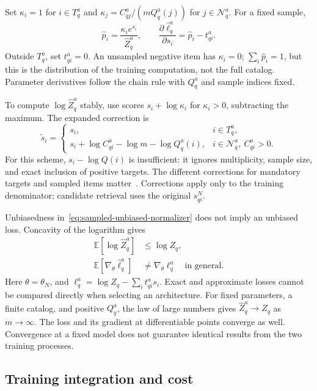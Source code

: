\documentclass[12pt,a4paper]{article}
\newcommand{\E}{\mathbb E}
\theoremstyle{plainru}
\begin{document}
Set $\kappa_i=1$ for $i\in T_q^a$ and
$\kappa_j=C_{qj}^a/(mQ_q^a(j))$ for $j\in\mathcal N_q^a$.
For a fixed sample,
\begin{equation}\label{eq:sampled-gradient}
\widehat p_i=\frac{\kappa_i e^{s_i}}{\widehat Z_q^a},
\qquad
\frac{\partial\widehat\ell_q^a}{\partial s_i}
=\widehat p_i-t_{qi}^a.
\end{equation}
Outside $T_q^a$, set $t_{qi}^a=0$. An unsampled negative item has $\kappa_i=0$;
$\sum_i\widehat p_i=1$, but this is the distribution of the training computation,
not the full catalog. Parameter derivatives follow the chain rule
with $Q_q^a$ and sample indices fixed.

To compute $\log\widehat Z_q^a$ stably, use scores
$s_i+\log\kappa_i$ for $\kappa_i>0$, subtracting the maximum.
The expanded correction is
\begin{equation}\label{eq:sampled-adjusted-score}
\widetilde s_i=
\begin{cases}
s_i, & i\in T_q^a,\\
s_i+\log C_{qi}^a-\log m-\log Q_q^a(i),
& i\in\mathcal N_q^a,\ C_{qi}^a>0.
\end{cases}
\end{equation}
For this scheme, $s_i-\log Q(i)$ is insufficient: it ignores multiplicity,
sample size, and exact inclusion of positive targets. The different corrections
for mandatory targets and sampled items matter~\cite{logq2025}.
Corrections apply only to the training denominator;
candidate retrieval uses the original $s_{qi}^N$.

Unbiasedness in~\eqref{eq:sampled-unbiased-normalizer}
does not imply an unbiased loss. Concavity of the logarithm gives
\begin{align}\label{eq:sampled-bias}
\E[\log\widehat Z_q^a]&\le\log Z_q,\\
\E[\nabla_\theta\widehat\ell_q^a]
&\ne\nabla_\theta\ell_q^a
\quad\text{in general}.\nonumber
\end{align}
Here $\theta=\theta_N$, and
$\ell_q^a=\log Z_q-\sum_i t_{qi}^as_i$.
Exact and approximate losses cannot be compared directly
when selecting an architecture.
For fixed parameters, a finite catalog, and positive
$Q_q^a$, the law of large numbers gives
$\widehat Z_q^a\to Z_q$ as $m\to\infty$.
The loss and its gradient at differentiable points converge as well.
Convergence at a fixed model does not guarantee identical
results from the two training processes.

\subsection{Training integration and cost}
\label{sec:sampled-protocol}
\end{document}
